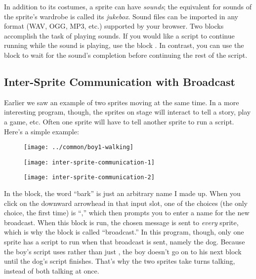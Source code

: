 \documentclass{report}
\begin{document}
In addition to its costumes, a sprite can have \emph{sounds}; the equivalent for sounds of the sprite's wardrobe is called its \emph{jukebox}. Sound files can be imported in any format (WAV, OGG, MP3, etc.) supported by your browser. Two blocks accomplish the task of playing sounds. If you would like a script to continue running while the sound is playing, use the block . In contrast, you can use the  block to wait for the sound's completion before continuing the rest of the script.

\subsection{Inter-Sprite Communication with Broadcast}

Earlier we saw an example of two sprites moving at the same time. In a more interesting program, though, the sprites on stage will interact to tell a story, play a game, etc. Often one sprite will have to tell another sprite to run a script. Here's a simple example:\nopagebreak

\begin{figure}[H]
\begin{minipage}{0.5\textwidth}
\centering
\texttt{[image: ../common/boy1-walking]}
\end{minipage}%
\begin{minipage}{0.5\textwidth}
\centering
{}
\end{minipage}

\vspace{3ex}
\begin{minipage}[t]{0.5\textwidth}
\centering
\vspace{0pt} %
\texttt{[image: inter-sprite-communication-1]}
\end{minipage}%
\begin{minipage}[t]{0.5\textwidth}
\centering
\vspace{0pt} %
\texttt{[image: inter-sprite-communication-2]}
\end{minipage}
\end{figure}

In the  block, the word ``bark'' is just an arbitrary name I made up. When you click on the downward arrowhead in that input slot, one of the choices (the only choice, the first time) is ``,'' which then prompts you to enter a name for the new broadcast. When this block is run, the chosen message is sent to \emph{every} sprite, which is why the block is called ``broadcast.'' In this program, though, only one sprite has a script to run when that broadcast is sent, namely the dog. Because the boy's script uses  rather than just , the boy doesn't go on to his next  block until the dog's script finishes. That's why the two sprites take turns talking, instead of both talking at once.
\end{document}
